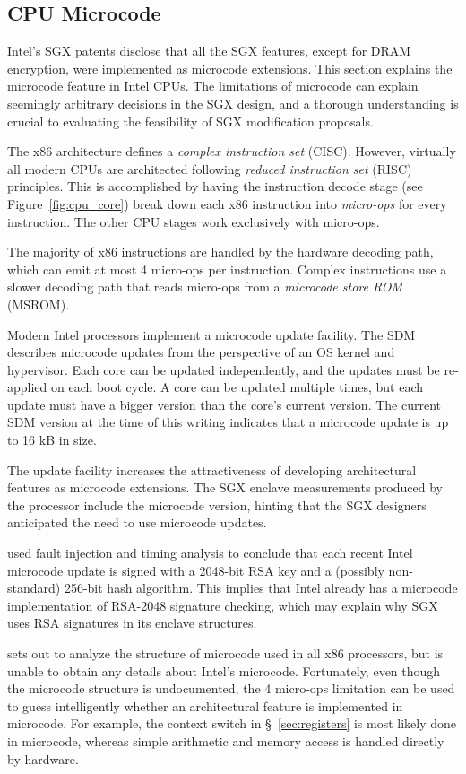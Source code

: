 \subsection{CPU Microcode}
\label{sec:microcode}

Intel's SGX patents disclose that all the SGX features, except for DRAM
encryption, were implemented as microcode extensions. This section explains the
microcode feature in Intel CPUs. The limitations of microcode can explain
seemingly arbitrary decisions in the SGX design, and a thorough understanding
is crucial to evaluating the feasibility of SGX modification proposals.

The x86 architecture defines a \textit{complex instruction set} (CISC).
However, virtually all modern CPUs are architected following \textit{reduced
instruction set} (RISC) principles. This is accomplished by having the
instruction decode stage (see Figure~\ref{fig:cpu_core}) break down each x86
instruction into \textit{micro-ops} for every instruction. The other CPU stages
work exclusively with micro-ops.

The majority of x86 instructions are handled by the hardware decoding path,
which can emit at most 4 micro-ops per instruction. Complex instructions use a
slower decoding path that reads micro-ops from a \textit{microcode store ROM}
(MSROM).


Modern Intel processors implement a microcode update facility. The SDM
describes microcode updates from the perspective of an OS kernel and
hypervisor. Each core can be updated independently, and the updates must be
re-applied on each boot cycle. A core can be updated multiple times, but each
update must have a bigger version than the core's current version. The current
SDM version at the time of this writing indicates that a microcode update is
up to 16 kB in size.

The update facility increases the attractiveness of developing architectural
features as microcode extensions. The SGX enclave measurements produced by the
processor include the microcode version, hinting that the SGX designers
anticipated the need to use microcode updates.

\cite{hawkes2012microcode} used fault injection and timing analysis to conclude
that each recent Intel microcode update is signed with a 2048-bit RSA key and
a (possibly non-standard) 256-bit hash algorithm. This implies that Intel
already has a microcode implementation of RSA-2048 signature checking, which
may explain why SGX uses RSA signatures in its enclave structures.

\cite{chen2014microcode} sets out to analyze the structure of microcode used in
all x86 processors, but is unable to obtain any details about Intel's
microcode. Fortunately, even though the microcode structure is undocumented,
the 4 micro-ops limitation can be used to guess intelligently whether an
architectural feature is implemented in microcode. For example, the context
switch in \S~\ref{sec:registers} is most likely done in microcode, whereas
simple arithmetic and memory access is handled directly by hardware.

